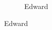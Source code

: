 \documentclass{article}
\begin{document}
\begin{figure}
	\caption{Edward}
\end{figure}

\clearpage

Edward

\printindex
\end{document}
